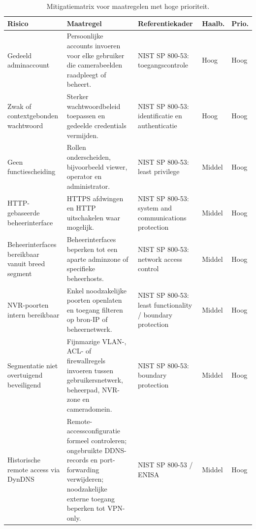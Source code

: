 \begin{table}[htbp]
    \centering
    \scriptsize
    \renewcommand{\arraystretch}{1.2}
    \caption[Mitigatiematrix met hoge prioriteit]{Mitigatiematrix voor maatregelen met hoge prioriteit.}
    \label{tab:mitigatie-hoog}
    \begin{tabular}{p{}p{}p{}p{}p{}}
        \hline
        \textbf{Risico} & \textbf{Maatregel} & \textbf{Referentiekader} & \textbf{Haalb.} & \textbf{Prio.} \\
        \hline
        Gedeeld adminaccount & Persoonlijke accounts invoeren voor elke gebruiker die camerabeelden raadpleegt of beheert. & NIST SP 800-53: toegangscontrole & Hoog & Hoog \\
        \hline
        Zwak of contextgebonden wachtwoord & Sterker wachtwoordbeleid toepassen en gedeelde credentials vermijden. & NIST SP 800-53: identificatie en authenticatie & Hoog & Hoog \\
        \hline
        Geen functiescheiding & Rollen onderscheiden, bijvoorbeeld viewer, operator en administrator. & NIST SP 800-53: least privilege & Middel & Hoog \\
        \hline
        HTTP-gebaseerde beheerinterface & HTTPS afdwingen en HTTP uitschakelen waar mogelijk. & NIST SP 800-53: system and communications protection & Middel & Hoog \\
        \hline
        Beheerinterfaces bereikbaar vanuit breed segment & Beheerinterfaces beperken tot een aparte adminzone of specifieke beheerhosts. & NIST SP 800-53: network access control & Middel & Hoog \\
        \hline
        NVR-poorten intern bereikbaar & Enkel noodzakelijke poorten openlaten en toegang filteren op bron-IP of beheernetwerk. & NIST SP 800-53: least functionality / boundary protection & Middel & Hoog \\
        \hline
        Segmentatie niet overtuigend beveiligend & Fijnmazige VLAN-, ACL- of firewallregels invoeren tussen gebruikersnetwerk, beheerpad, NVR-zone en cameradomein. & NIST SP 800-53: boundary protection & Middel & Hoog \\
        \hline
        Historische remote access via DynDNS & Remote-accessconfiguratie formeel controleren; ongebruikte DDNS-records en port-forwarding verwijderen; noodzakelijke externe toegang beperken tot VPN-only. & NIST SP 800-53 / ENISA & Middel & Hoog \\
        \hline
    \end{tabular}
\end{table}

